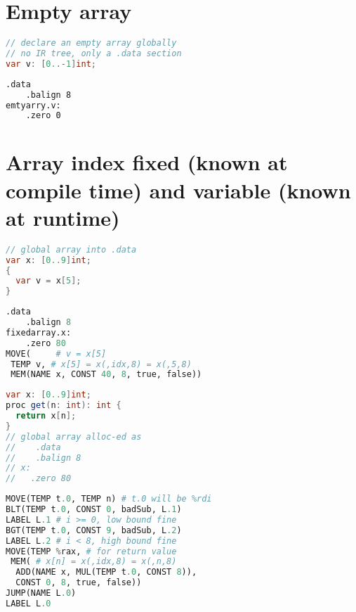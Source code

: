 \section*{Empty array}
\begin{minipage}{.45\linewidth}
\begin{lstlisting}[language=Java,morekeywords={var},frame=none]
// declare an empty array globally
// no IR tree, only a .data section
var v: [0..-1]int;
\end{lstlisting}
\end{minipage}
\begin{minipage}{.55\linewidth}
\begin{lstlisting}[language=bash,frame=none]
    .data
    .balign 8
emtyarry.v:
    .zero 0
\end{lstlisting}
\end{minipage}

\section*{Array index fixed (known at compile time) and variable (known at runtime)}
\begin{minipage}{.45\linewidth}
\begin{lstlisting}[language=Java,morekeywords={var},frame=none]
// global array into .data
var x: [0..9]int;
{
  var v = x[5];
}
\end{lstlisting}
\end{minipage}
\begin{minipage}{.55\linewidth}
\begin{lstlisting}[language=Python,frame=none]
    .data
    .balign 8
fixedarray.x:
	.zero 80
MOVE(     # v = x[5]
 TEMP v, # x[5] = x(,idx,8) = x(,5,8)
 MEM(NAME x, CONST 40, 8, true, false))
\end{lstlisting}
\end{minipage}

\begin{minipage}{.45\linewidth}
\begin{lstlisting}[language=Java,morekeywords={proc,var},frame=none]
var x: [0..9]int;
proc get(n: int): int {
  return x[n];
}
// global array alloc-ed as
//    .data
//    .balign 8
// x:
//   .zero 80
\end{lstlisting}
\end{minipage}
\begin{minipage}{.55\linewidth}
\begin{lstlisting}[language=Python,frame=none]
MOVE(TEMP t.0, TEMP n) # t.0 will be %rdi
BLT(TEMP t.0, CONST 0, badSub, L.1)
LABEL L.1 # i >= 0, low bound fine
BGT(TEMP t.0, CONST 9, badSub, L.2)
LABEL L.2 # i < 8, high bound fine
MOVE(TEMP %rax, # for return value
 MEM( # x[n] = x(,idx,8) = x(,n,8)
  ADD(NAME x, MUL(TEMP t.0, CONST 8)),
  CONST 0, 8, true, false))
JUMP(NAME L.0)
LABEL L.0
\end{lstlisting}
\end{minipage}

